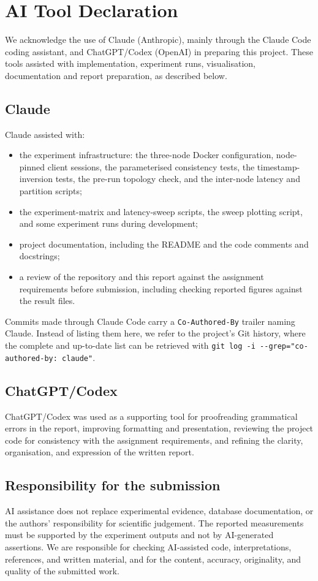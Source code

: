 \section{AI Tool Declaration}\label{app:ai-declaration}

We acknowledge the use of Claude (Anthropic), mainly through the Claude Code coding assistant, and ChatGPT/Codex (OpenAI) in preparing this project. These tools assisted with implementation, experiment runs, visualisation, documentation and report preparation, as described below.

\subsection*{Claude}
Claude assisted with:
\begin{itemize}
  \item the experiment infrastructure: the three-node Docker configuration, node-pinned client sessions, the parameterised consistency tests, the timestamp-inversion tests, the pre-run topology check, and the inter-node latency and partition scripts;
  \item the experiment-matrix and latency-sweep scripts, the sweep plotting script, and some experiment runs during development;
  \item project documentation, including the README and the code comments and docstrings;
  \item a review of the repository and this report against the assignment requirements before submission, including checking reported figures against the result files.
\end{itemize}
Commits made through Claude Code carry a \texttt{Co-Authored-By} trailer naming Claude. Instead of listing them here, we refer to the project's Git history, where the complete and up-to-date list can be retrieved with \texttt{git log -i -{}-grep="co-authored-by: claude"}.

\subsection*{ChatGPT/Codex}
ChatGPT/Codex was used as a supporting tool for proofreading grammatical errors in the report, improving formatting and presentation, reviewing the project code for consistency with the assignment requirements, and refining the clarity, organisation, and expression of the written report.

\subsection*{Responsibility for the submission}
AI assistance does not replace experimental evidence, database documentation, or the authors' responsibility for scientific judgement. The reported measurements must be supported by the experiment outputs and not by AI-generated assertions. We are responsible for checking AI-assisted code, interpretations, references, and written material, and for the content, accuracy, originality, and quality of the submitted work.
